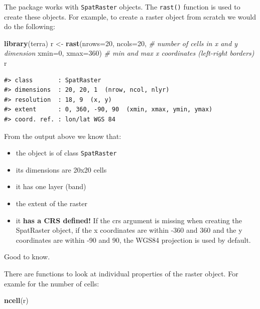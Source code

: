 \documentclass[
]{book}
\newenvironment{Shaded}{\begin{snugshade}}{\end{snugshade}}
\newcommand{\AttributeTok}[1]{\textcolor[rgb]{0.13,0.29,0.53}{#1}}
\newcommand{\CommentTok}[1]{\textcolor[rgb]{0.56,0.35,0.01}{\textit{#1}}}
\newcommand{\DecValTok}[1]{\textcolor[rgb]{0.00,0.00,0.81}{#1}}
\newcommand{\FunctionTok}[1]{\textcolor[rgb]{0.13,0.29,0.53}{\textbf{#1}}}
\newcommand{\NormalTok}[1]{#1}
\newcommand{\OtherTok}[1]{\textcolor[rgb]{0.56,0.35,0.01}{#1}}
\providecommand{\tightlist}{%
  \setlength{\itemsep}{0pt}\setlength{\parskip}{0pt}}
\begin{document}
The package works with \texttt{SpatRaster} objects. The \texttt{rast()} function is used to create these objects. For example, to create a raster object from scratch we would do the following:

\begin{Shaded}
\begin{Highlighting}[]
\FunctionTok{library}\NormalTok{(terra)}
\NormalTok{r }\OtherTok{\textless{}{-}} \FunctionTok{rast}\NormalTok{(}\AttributeTok{nrows=}\DecValTok{20}\NormalTok{, }\AttributeTok{ncols=}\DecValTok{20}\NormalTok{, }\CommentTok{\# number of cells in x and y dimension}
          \AttributeTok{xmin=}\DecValTok{0}\NormalTok{, }\AttributeTok{xmax=}\DecValTok{360}\NormalTok{) }\CommentTok{\# min and max x coordinates (left{-}right borders)}
\NormalTok{r}
\end{Highlighting}
\end{Shaded}

\begin{verbatim}
#> class       : SpatRaster 
#> dimensions  : 20, 20, 1  (nrow, ncol, nlyr)
#> resolution  : 18, 9  (x, y)
#> extent      : 0, 360, -90, 90  (xmin, xmax, ymin, ymax)
#> coord. ref. : lon/lat WGS 84
\end{verbatim}

From the output above we know that:

\begin{itemize}
\tightlist
\item
  the object is of class \texttt{SpatRaster}
\item
  its dimensions are 20x20 cells
\item
  it has one layer (band)
\item
  the extent of the raster
\item
  it \textbf{has a CRS defined!} If the crs argument is missing when creating the SpatRaster object, if the x coordinates are within -360 and 360 and the y coordinates are within -90 and 90, the WGS84 projection is used by default.
\end{itemize}

Good to know.

There are functions to look at individual properties of the raster object. For examle for the number of cells:

\begin{Shaded}
\begin{Highlighting}[]
\FunctionTok{ncell}\NormalTok{(r)}
\end{Highlighting}
\end{Shaded}
\end{document}

